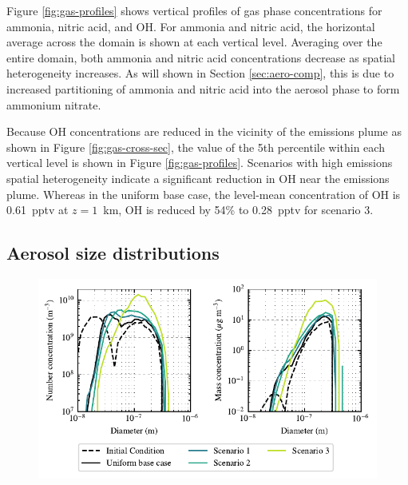 \documentclass[journal abbreviation, manuscript]{copernicus}
\begin{document}
Figure \ref{fig:gas-profiles} shows vertical profiles of gas phase concentrations for ammonia, nitric acid, and OH. For ammonia and nitric acid, the horizontal average across the domain is shown at each vertical level.  Averaging over the entire domain, both ammonia and nitric acid concentrations decrease as spatial heterogeneity increases. As will shown in Section \ref{sec:aero-comp}, this is due to increased partitioning of ammonia and nitric acid into the aerosol phase to form ammonium nitrate. 

Because OH concentrations are reduced in the vicinity of the emissions plume as shown in Figure \ref{fig:gas-cross-sec}, the value of the 5th percentile within each vertical level is shown in Figure \ref{fig:gas-profiles}. Scenarios with high emissions spatial heterogeneity indicate a significant reduction in OH near the emissions plume. Whereas in the uniform base case, the level-mean concentration of OH is 0.61~pptv at $z=1$~km, OH is reduced by 54\% to 0.28~pptv for scenario 3.  

\subsection{Aerosol size distributions}\label{sec:size-dist}

\begin{figure}[!h]
	\centering
	\includegraphics[]{figures/combined_num_mass_conc_i50_j50_k60.pdf}
	\caption{}
	\label{fig:size-dists}
\end{figure} 
\end{document}
